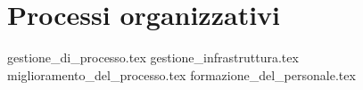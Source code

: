 \section{Processi organizzativi}
{gestione_di_processo.tex}
{gestione_infrastruttura.tex}
{miglioramento_del_processo.tex}
{formazione_del_personale.tex}
